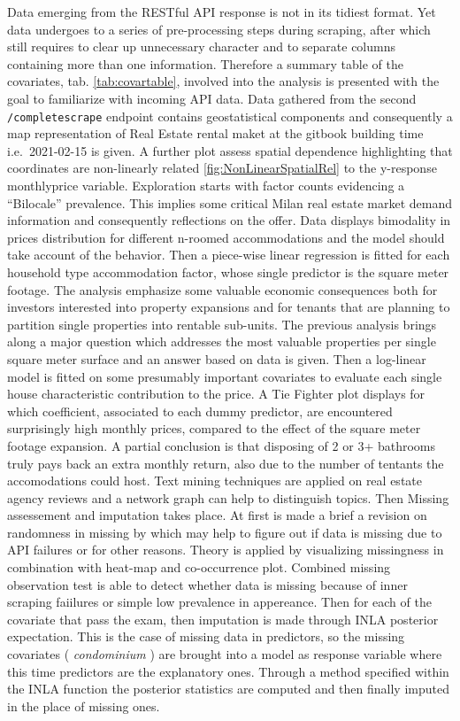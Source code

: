\documentclass[
  12pt,
  a4paper,
  oneside]{book}
\newcommand{\passthrough}[1]{#1}
\theoremstyle{definition}
\theoremstyle{definition}
\theoremstyle{definition}
\theoremstyle{remark}
\begin{document}
Data emerging from the RESTful API response is not in its tidiest format. Yet data undergoes to a series of pre-processing steps during scraping, after which still requires to clear up unnecessary character and to separate columns containing more than one information. Therefore a summary table of the covariates, tab. \ref{tab:covartable}, involved into the analysis is presented with the goal to familiarize with incoming API data. Data gathered from the second \passthrough{\lstinline!/completescrape!} endpoint contains geostatistical components and consequently a map representation of Real Estate rental maket at the gitbook building time i.e.~2021-02-15 is given. A further plot assess spatial dependence highlighting that coordinates are non-linearly related \ref{fig:NonLinearSpatialRel} to the y-response monthlyprice variable. Exploration starts with factor counts evidencing a ``Bilocale'' prevalence. This implies some critical Milan real estate market demand information and consequently reflections on the offer. Data displays bimodality in prices distribution for different n-roomed accommodations and the model should take account of the behavior. Then a piece-wise linear regression is fitted for each household type accommodation factor, whose single predictor is the square meter footage. The analysis emphasize some valuable economic consequences both for investors interested into property expansions and for tenants that are planning to partition single properties into rentable sub-units. The previous analysis brings along a major question which addresses the most valuable properties per single square meter surface and an answer based on data is given. Then a log-linear model is fitted on some presumably important covariates to evaluate each single house characteristic contribution to the price. A Tie Fighter plot displays for which coefficient, associated to each dummy predictor, are encountered surprisingly high monthly prices, compared to the effect of the square meter footage expansion. A partial conclusion is that disposing of 2 or 3+ bathrooms truly pays back an extra monthly return, also due to the number of tentants the accomodations could host. Text mining techniques are applied on real estate agency reviews and a network graph can help to distinguish topics. Then Missing assessement and imputation takes place. At first is made a brief a revision on randomness in missing by \citet{Little} which may help to figure out if data is missing due to API failures or for other reasons. Theory is applied by visualizing missingness in combination with heat-map and co-occurrence plot. Combined missing observation test is able to detect whether data is missing because of inner scraping faiilures or simple low prevalence in appereance. Then for each of the covariate that pass the exam, then imputation is made through INLA posterior expectation. This is the case of missing data in predictors, so the missing covariates ( \emph{condominium} ) are brought into a model as response variable where this time predictors are the explanatory ones. Through a method specified within the INLA function the posterior statistics are computed and then finally imputed in the place of missing ones.
\end{document}
